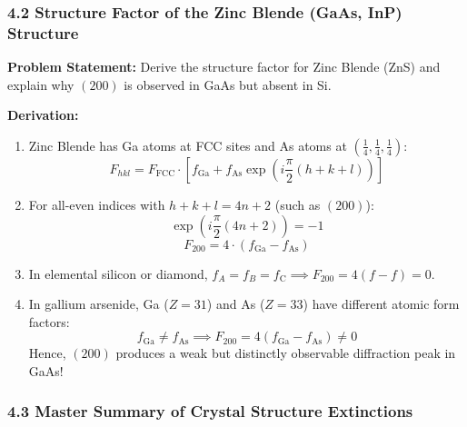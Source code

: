 \documentclass[11pt,a4paper]{article}
\begin{document}
\subsubsection{4.2 Structure Factor of the Zinc Blende (GaAs, InP) Structure}

\begin{solbox}
\textbf{Problem Statement:} Derive the structure factor for Zinc Blende (ZnS) and explain why $(200)$ is observed in GaAs but absent in Si.

\textbf{Derivation:}
\begin{enumerate}
    \item Zinc Blende has Ga atoms at FCC sites and As atoms at $\left(\frac{1}{4}, \frac{1}{4}, \frac{1}{4}\right)$:
    \begin{equation}
    F_{hkl} = F_{\text{FCC}} \cdot \left[ f_{\text{Ga}} + f_{\text{As}} \exp\left(i\frac{\pi}{2}(h+k+l)\right) \right]
    \end{equation}
    \item For all-even indices with $h+k+l = 4n+2$ (such as $(200)$):
    \begin{equation}
    \exp\left(i\frac{\pi}{2}(4n+2)\right) = -1
    \end{equation}
    \begin{equation}
    F_{200} = 4 \cdot (f_{\text{Ga}} - f_{\text{As}})
    \end{equation}
    \item In elemental silicon or diamond, $f_A = f_B = f_{\text{C}} \implies F_{200} = 4(f - f) = 0$.
    \item In gallium arsenide, Ga ($Z=31$) and As ($Z=33$) have different atomic form factors:
    \begin{equation}
    f_{\text{Ga}} \neq f_{\text{As}} \implies F_{200} = 4(f_{\text{Ga}} - f_{\text{As}}) \neq 0
    \end{equation}
    Hence, $(200)$ produces a weak but distinctly observable diffraction peak in GaAs!
\end{enumerate}
\end{solbox}

\subsubsection{4.3 Master Summary of Crystal Structure Extinctions}
\end{document}

